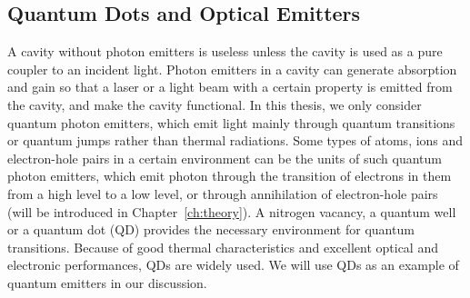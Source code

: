 \subsection{Quantum Dots and Optical Emitters}
A cavity without photon emitters is useless unless the cavity is used as a pure coupler to an incident light. Photon emitters in a cavity can generate absorption and gain so that a laser or a light beam with a certain property is emitted from the cavity, and make the cavity functional. In this thesis, we only consider quantum photon emitters, which emit light mainly through quantum transitions or quantum jumps rather than thermal radiations. Some types of atoms, ions and electron-hole pairs in a certain environment can be the units of such quantum photon emitters, which emit photon through the transition of electrons in them from a high level to a low level, or through annihilation of electron-hole pairs (will be introduced in Chapter~\ref{ch:theory}). A nitrogen vacancy, a quantum well or a quantum dot (QD) provides the necessary environment for quantum transitions. Because of good thermal characteristics and excellent optical and electronic performances, QDs are widely used. We will use QDs as an example of quantum emitters in our discussion.


